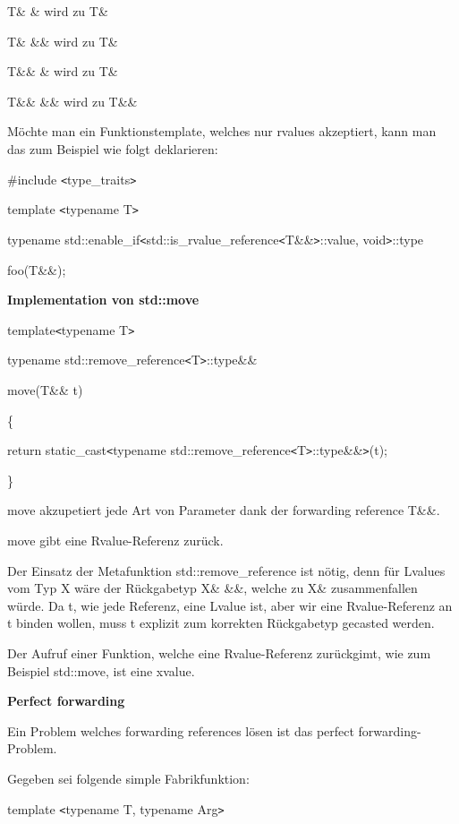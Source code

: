 \documentclass{article}
\begin{document}
T\& \& wird zu T\&

T\& \&\& wird zu T\&

T\&\& \& wird zu T\&

T\&\& \&\& wird zu T\&\&

\vspace{12pt}
Möchte man ein Funktionstemplate, welches nur rvalues akzeptiert, kann man das 
zum Beispiel wie folgt deklarieren:

\#include \texttt{<}type\_traits\texttt{>}

template \texttt{<}typename T\texttt{>}

typename std::enable\_if\texttt{<}std::is\_rvalue\_reference\texttt{<}T\&\&\texttt{>}::value, 
void\texttt{>}::type

foo(T\&\&);

\vspace{12pt}
\textbf{Implementation von std::move}

template\texttt{<}typename T\texttt{>}

typename std::remove\_reference\texttt{<}T\texttt{>}::type\&\&

move(T\&\& t)

\{    

\parindent=14pt
return static\_cast\texttt{<}typename std::remove\_reference\texttt{<}T\texttt{>}::type\&\&\texttt{>}(t);

\parindent=0pt
\}

move akzupetiert jede Art von Parameter dank der forwarding reference T\&\&.

move gibt eine Rvalue-Referenz zurück.

Der Einsatz der Metafunktion std::remove\_reference ist nötig, denn für Lvalues 
vom Typ X wäre der Rückgabetyp X\& \&\&, welche zu X\& zusammenfallen würde. 
Da t, wie jede Referenz, eine Lvalue ist, aber wir eine Rvalue-Referenz an t binden 
wollen, muss t explizit zum korrekten Rückgabetyp gecasted werden. 

Der Aufruf einer Funktion, welche eine Rvalue-Referenz zurückgimt, wie zum Beispiel 
std::move, ist eine xvalue.

\vspace{12pt}
\textbf{Perfect forwarding}

Ein Problem welches forwarding references lösen ist das perfect forwarding-Problem.

Gegeben sei folgende simple Fabrikfunktion:

template \texttt{<}typename T, typename Arg\texttt{>}
\end{document}
